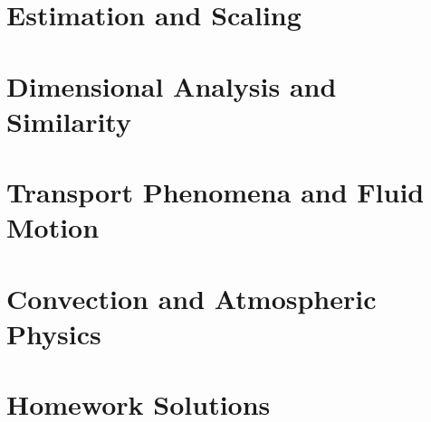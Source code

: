 \documentclass[12pt, a4paper]{article}
\begin{document}
\thispagestyle{empty}
\newpage
\tableofcontents
\newpage

\part{Estimation and Scaling}

\newpage

\newpage

\newpage

\part{Dimensional Analysis and Similarity}

\newpage

\newpage

\part{Transport Phenomena and Fluid Motion}

\newpage

\part{Convection and Atmospheric Physics}

\newpage

\newpage

\newpage

\newpage

\newpage


\part{Homework Solutions}

\newpage

\newpage

\newpage

\newpage

\newpage

\end{document}
